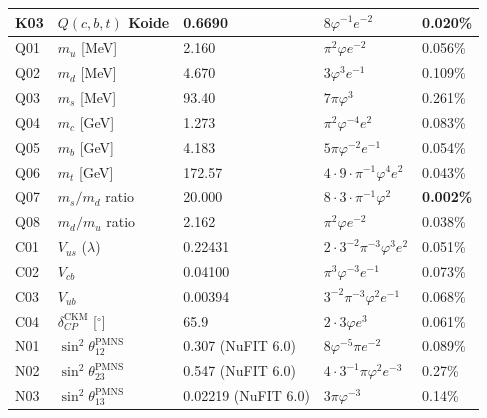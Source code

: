 \documentclass[10pt,a4paper]{article}
\begin{document}
\begin{longtable}{@{}lllll@{}}
K03 & $Q(c,b,t)$ Koide                     & 0.6690   & $8\varphi^{-1}e^{-2}$                              & 0.020\% \\
\midrule
Q01 & $m_u$ [MeV]                          & 2.160    & $\pi^2\varphi e^{-2}$                              & 0.056\% \\
Q02 & $m_d$ [MeV]                          & 4.670    & $3\varphi^3 e^{-1}$                                & 0.109\% \\
Q03 & $m_s$ [MeV]                          & 93.40    & $7\pi\varphi^3$                                    & 0.261\% \\
Q04 & $m_c$ [GeV]                          & 1.273    & $\pi^2\varphi^{-4}e^2$                             & 0.083\% \\
Q05 & $m_b$ [GeV]                          & 4.183    & $5\pi\varphi^{-2}e^{-1}$                           & 0.054\% \\
Q06 & $m_t$ [GeV]                          & 172.57   & $4{\cdot}9{\cdot}\pi^{-1}\varphi^4 e^2$            & 0.043\% \\
Q07 & $m_s/m_d$ ratio                      & 20.000   & $8{\cdot}3{\cdot}\pi^{-1}\varphi^2$                & \textbf{0.002\%} \\
Q08 & $m_d/m_u$ ratio                      & 2.162    & $\pi^2\varphi e^{-2}$                              & 0.038\% \\
\midrule
C01 & $V_{us}$ ($\lambda$)                 & 0.22431  & $2{\cdot}3^{-2}\pi^{-3}\varphi^3 e^2$              & 0.051\% \\
C02 & $V_{cb}$                             & 0.04100  & $\pi^3\varphi^{-3}e^{-1}$                          & 0.073\% \\
C03 & $V_{ub}$                             & 0.00394  & $3^{-2}\pi^{-3}\varphi^2 e^{-1}$                   & 0.068\% \\
C04 & $\delta_{CP}^{\text{CKM}}$ [$^\circ$] & 65.9  & $2{\cdot}3\varphi e^3$                             & 0.061\% \\
\midrule
N01 & $\sin^2\theta_{12}^{\text{PMNS}}$    & 0.307 (NuFIT 6.0) & $8\varphi^{-5}\pi e^{-2}$  & 0.089\% \\
N02 & $\sin^2\theta_{23}^{\text{PMNS}}$    & 0.547 (NuFIT 6.0) & $4{\cdot}3^{-1}\pi\varphi^2 e^{-3}$ & 0.27\% \\
N03 & $\sin^2\theta_{13}^{\text{PMNS}}$    & 0.02219 (NuFIT 6.0) & $3\pi\varphi^{-3}$ & 0.14\% \\

\end{longtable}
\end{document}
